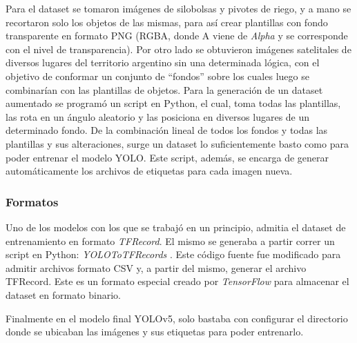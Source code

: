 Para el dataset se tomaron imágenes de silobolsas y pivotes de riego, y a mano se recortaron solo los objetos de las mismas, para así crear plantillas con fondo transparente en formato PNG (RGBA, donde A viene de \textit{Alpha} y se corresponde con el nivel de transparencia). Por otro lado se obtuvieron imágenes satelitales de diversos lugares del territorio argentino sin una determinada lógica, con el objetivo de conformar un conjunto de ``fondos'' sobre los cuales luego se combinarían con las plantillas de objetos. Para la generación de un dataset aumentado se programó un script en Python, el cual, toma todas las plantillas, las rota en un ángulo aleatorio y las posiciona en diversos lugares de un determinado fondo. De la combinación lineal de todos los fondos y todas las plantillas y sus alteraciones, surge un dataset lo suficientemente basto como para poder entrenar el modelo YOLO. Este script, además, se encarga de generar automáticamente los archivos de etiquetas para cada imagen nueva.

\subsubsection{Formatos}
Uno de los modelos con los que se trabajó en un principio, admitia el dataset de entrenamiento en formato \textit{TFRecord}. El mismo se generaba a partir correr un script en Python: \textit{YOLOToTFRecords} \cite{yolototfrecords}.
Este código fuente fue modificado para admitir archivos formato CSV y, a partir del mismo, generar el archivo TFRecord. Este es un formato especial creado por \textit{TensorFlow} para almacenar el dataset en formato binario.

Finalmente en el modelo final YOLOv5, solo bastaba con configurar el directorio donde se ubicaban las imágenes y sus etiquetas para poder entrenarlo.


